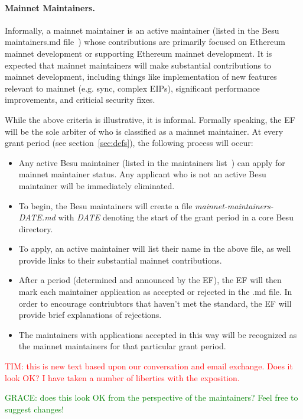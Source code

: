 \paragraph{Mainnet Maintainers.} Informally, a mainnet maintainer is an active maintainer (listed in the Besu maintainers.md file~\cite{BesuM}) whose contributions are primarily focused on Ethereum mainnet development or supporting Ethereum mainnet development.  It is expected that mainnet maintainers will make substantial contributions to mainnet development, including things like implementation of new features relevant to mainnet (e.g. sync, complex EIPs), significant performance improvements, and criticial security fixes.

While the above criteria is illustrative, it is informal.  Formally speaking, the EF will be the sole arbiter of who is classified as a mainnet maintainer.  At every grant period (see section~\ref{sec:defs}), the following process will occur:
\begin{itemize}
\item Any active Besu maintainer (listed in the maintainers list~\cite{BesuM}) can apply for mainnet maintainer status.  Any applicant who is not an active Besu maintainer will be immediately eliminated.
\item To begin, the Besu maintainers will create a file \emph{mainnet-maintainers-DATE.md} with \emph{DATE} denoting the start of the grant period in a core Besu directory.
\item To apply, an active maintainer will list their name in the above file, as well provide links to their substantial mainnet contributions.
\item After a period (determined and announced by the EF), the EF will then mark each maintainer application as accepted or rejected in the .md file.  In order to encourage contriubtors that haven't met the standard, the EF will provide brief explanations of rejections.
\item The maintainers with applications accepted in this way will be recognized as the mainnet maintainers for that particular grant period.
\end{itemize}

\textcolor{red}{TIM:  this is new text based upon our conversation and email exchange.  Does it look OK?  I have taken a number of liberties with the exposition.}

\textcolor{green}{GRACE:  does this look OK from the perspective of the maintainers? Feel free to suggest changes!}

